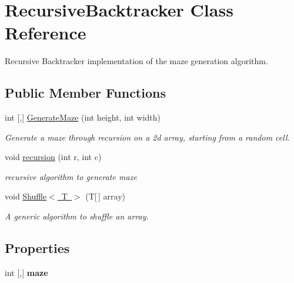\hypertarget{class_recursive_backtracker}{}\section{Recursive\+Backtracker Class Reference}
\label{class_recursive_backtracker}


Recursive Backtracker implementation of the maze generation algorithm.  


\subsection*{Public Member Functions}
\begin{DoxyCompactItemize}
\item 
int \mbox{[},\mbox{]} \mbox{\hyperlink{class_recursive_backtracker_aad90aef96d152cffe30e82cf2d25a249}{Generate\+Maze}} (int height, int width)
\begin{DoxyCompactList}\small\item\em Generate a maze through recursion on a 2d array, starting from a random cell. \end{DoxyCompactList}\item 
void \mbox{\hyperlink{class_recursive_backtracker_a6c674f12c0bfe5b443c1d52b15beb311}{recursion}} (int r, int c)
\begin{DoxyCompactList}\small\item\em recursive algorithm to generate maze \end{DoxyCompactList}\item 
void \mbox{\hyperlink{class_recursive_backtracker_a982f5e5e9fc3e26f59d0f63d23c2e867}{Shuffle$<$ T $>$}} (T\mbox{[}$\,$\mbox{]} array)
\begin{DoxyCompactList}\small\item\em A generic algorithm to shuffle an array. \end{DoxyCompactList}\end{DoxyCompactItemize}
\subsection*{Properties}
\begin{DoxyCompactItemize}
\item 
\mbox{\label{class_recursive_backtracker_a014a89a3667131304248d09b56c52d56}} 
int \mbox{[},\mbox{]} {\bfseries maze}
\end{DoxyCompactItemize}
